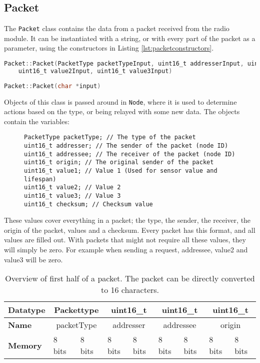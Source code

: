 \subsection{Packet}
The \texttt{Packet} class contains the data from a packet received from the radio module. It can be instantiated with a string, or with every part of the packet as a parameter, using the constructors in Listing \ref{lst:packetconstructors}.
\begin{lstlisting}[language=C,label={lst:packetconstructors},caption={Packet constructors}]
Packet::Packet(PacketType packetTypeInput, uint16_t addresserInput, uint16_t addresseeInput, uint16_t originInput, uint16_t value1Input,
	uint16_t value2Input, uint16_t value3Input)
	
Packet::Packet(char *input)
\end{lstlisting}

Objects of this class is passed around in \texttt{Node}, where it is used to determine actions based on the type, or being relayed with some new data. 
The objects contain the variables:
\begin{figure}
\begin{lstlisting}
PacketType packetType; // The type of the packet
uint16_t addresser; // The sender of the packet (node ID)
uint16_t addressee; // The receiver of the packet (node ID)
uint16_t origin; // The original sender of the packet
uint16_t value1; // Value 1 (Used for sensor value and lifespan)
uint16_t value2; // Value 2
uint16_t value3; // Value 3
uint16_t checksum; // Checksum value
\end{lstlisting}
\end{figure}
These values cover everything in a packet; the type, the sender, the receiver, the origin of the packet, values and a checksum.
Every packet has this format, and all values are filled out. With packets that might not require all these values, they will simply be zero. For example when sending a request, addressee, value2 and value3 will be zero.

\begin{table}[]
\centering
\begin{tabular}{|l|c|l|c|l|c|l|c|l|}
\hline
\textbf{Datatype} & \multicolumn{2}{c|}{Packettype}      & \multicolumn{2}{c|}{uint16\_t}       & \multicolumn{2}{c|}{uint16\_t}       & \multicolumn{2}{c|}{uint16\_t}       \\ \hline
\textbf{Name}     & \multicolumn{2}{c|}{packetType}      & \multicolumn{2}{c|}{addresser}       & \multicolumn{2}{c|}{addressee}       & \multicolumn{2}{c|}{origin}          \\ \hline
\textbf{Memory}   & \multicolumn{1}{l|}{8 bits} & 8 bits & \multicolumn{1}{l|}{8 bits} & 8 bits & \multicolumn{1}{l|}{8 bits} & 8 bits & \multicolumn{1}{l|}{8 bits} & 8 bits \\ \hline
\end{tabular}
\caption{Overview of first half of a packet. The packet can be directly converted to 16 characters.}
\label{tab:packetTableFirst}
\end{table}


